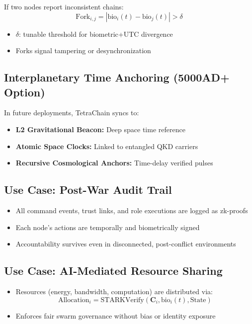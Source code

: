 \documentclass{article}
\begin{document}
If two nodes report inconsistent chains:
\[
\text{Fork}_{i,j} = \left| \text{bio}_i(t) - \text{bio}_j(t) \right| > \delta
\]

\begin{itemize}
    \item \( \delta \): tunable threshold for biometric+UTC divergence
    \item Forks signal tampering or desynchronization
\end{itemize}

\subsection*{Interplanetary Time Anchoring (5000AD+ Option)}

In future deployments, TetraChain syncs to:
\begin{itemize}
    \item \textbf{L2 Gravitational Beacon:} Deep space time reference
    \item \textbf{Atomic Space Clocks:} Linked to entangled QKD carriers
    \item \textbf{Recursive Cosmological Anchors:} Time-delay verified pulses
\end{itemize}

\subsection*{Use Case: Post-War Audit Trail}

\begin{itemize}
    \item All command events, trust links, and role executions are logged as zk-proofs
    \item Each node's actions are temporally and biometrically signed
    \item Accountability survives even in disconnected, post-conflict environments
\end{itemize}

\subsection*{Use Case: AI-Mediated Resource Sharing}

\begin{itemize}
    \item Resources (energy, bandwidth, computation) are distributed via:
    \[
    \text{Allocation}_i = \text{STARKVerify}(\mathbf{C}_i, \text{bio}_i(t), \text{State})
    \]
    \item Enforces fair swarm governance without bias or identity exposure
\end{itemize}
\end{document}
